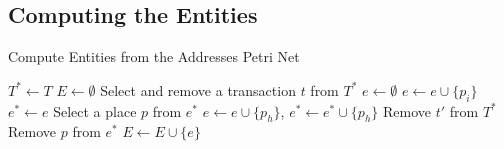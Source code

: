 \documentclass{beamer}
\begin{document}
\subsection{Computing the Entities}
\begin{frame}[fragile]{}
    \footnotesize
    \begin{algorithm}[H]
        \footnotesize
        \caption{Compute Entities from the Addresses Petri Net}\label{alg:entities}
        \begin{algorithmic}[1]
            \State $T^* \gets T$ 
            \State $E \gets \emptyset$ 
            \State Select and remove a transaction $t$ from $T^*$
            \State $e \gets \emptyset$ 
            \State $e \gets e \cup \{p_i\}$
            \EndFor
            \State $e^* \gets e$ 
            \State Select a place $p$ from $e^*$
            \State $e \gets e \cup \{p_h\}$, $e^* \gets e^* \cup \{p_h\}$
            \EndFor
            \State Remove $t'$ from $T^*$
            \EndFor
            \State Remove $p$ from $e^*$
            \EndWhile
            \State $E \gets E \cup \{e\}$
            \EndWhile
        \end{algorithmic}
    \end{algorithm}
\end{frame}
\end{document}
